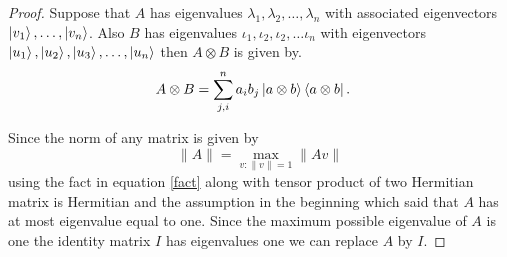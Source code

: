 \begin{proof}
Suppose that $A$ has eigenvalues $\lambda_1,\lambda_2,\dots ,\lambda_n$ with associated   eigenvectors $\ket{v_1},\dots,\ket{v_n}$.
Also $B$ has eigenvalues $\iota_1,\iota_2,\iota_2,\dots \iota_n$ with eigenvectors $\ket{u_1},\ket{u_2},\ket{u_3}, \dots ,\ket{u_n}$ then $A\otimes B$ is given by.
\begin{align}
 A\otimes B&=\sum_{j,i}^n  a_i b_j \ket{a\otimes b}\bra{a \otimes b}.
\end{align}

Since the norm of any matrix is given by
\begin{equation}
\| A \|=\max_{v: \| v\|=1}\| A v\|\label{fact}
\end{equation}
using the fact in equation \ref {fact} along with tensor product of two Hermitian matrix is Hermitian and the   assumption in the  beginning which said that $A$ has at most eigenvalue equal to one. Since the maximum possible eigenvalue of $A$ is one the identity matrix $I$ has eigenvalues one we can replace $A$ by  $I$.
\end{proof}

